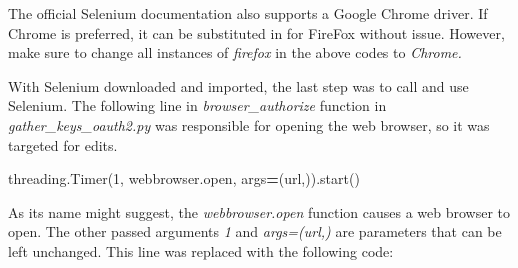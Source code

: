 \documentclass[]{book}
\newenvironment{Shaded}{\begin{snugshade}}{\end{snugshade}}
\newcommand{\DecValTok}[1]{\textcolor[rgb]{0.00,0.00,0.81}{#1}}
\newcommand{\SpecialCharTok}[1]{\textcolor[rgb]{0.00,0.00,0.00}{#1}}
\newcommand{\StringTok}[1]{\textcolor[rgb]{0.31,0.60,0.02}{#1}}
\newcommand{\OperatorTok}[1]{\textcolor[rgb]{0.81,0.36,0.00}{\textbf{#1}}}
\newcommand{\BuiltInTok}[1]{#1}
\newcommand{\NormalTok}[1]{#1}
\begin{document}
The official Selenium documentation also supports a Google Chrome
driver. If Chrome is preferred, it can be substituted in for FireFox
without issue. However, make sure to change all instances of
\emph{firefox} in the above codes to \emph{Chrome.}

With Selenium downloaded and imported, the last step was to call and use
Selenium. The following line in \emph{browser\_authorize} function in
\emph{gather\_keys\_oauth2.py} was responsible for opening the web
browser, so it was targeted for edits.

\begin{Shaded}
\begin{Highlighting}[]
\NormalTok{    threading.Timer(}\DecValTok{1}\NormalTok{, webbrowser.}\BuiltInTok{open}\NormalTok{, args}\OperatorTok{=}\NormalTok{(url,)).start()}
\end{Highlighting}
\end{Shaded}

As its name might suggest, the \emph{webbrowser.open} function causes a
web browser to open. The other passed arguments \emph{1} and
\emph{args=(url,)} are parameters that can be left unchanged. This line
was replaced with the following code:

\begin{Shaded}
\end{Shaded}
\end{document}
